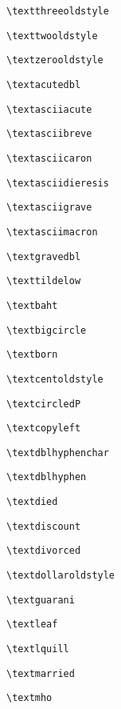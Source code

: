 \documentclass{scrartcl}
\begin{document}
\wrapglyph{\textthreeoldstyle} \verb+\textthreeoldstyle+\par
\wrapglyph{\texttwooldstyle} \verb+\texttwooldstyle+\par
\wrapglyph{\textzerooldstyle} \verb+\textzerooldstyle+\par
\wrapglyph{\textacutedbl} \verb+\textacutedbl+\par
\wrapglyph{\textasciiacute} \verb+\textasciiacute+\par
\wrapglyph{\textasciibreve} \verb+\textasciibreve+\par
\wrapglyph{\textasciicaron} \verb+\textasciicaron+\par
\wrapglyph{\textasciidieresis} \verb+\textasciidieresis+\par
\wrapglyph{\textasciigrave} \verb+\textasciigrave+\par
\wrapglyph{\textasciimacron} \verb+\textasciimacron+\par
\wrapglyph{\textgravedbl} \verb+\textgravedbl+\par
\wrapglyph{\texttildelow} \verb+\texttildelow+\par
\wrapglyph{\textbaht} \verb+\textbaht+\par
\wrapglyph{\textbigcircle} \verb+\textbigcircle+\par
\wrapglyph{\textborn} \verb+\textborn+\par
\wrapglyph{\textcentoldstyle} \verb+\textcentoldstyle+\par
\wrapglyph{\textcircledP} \verb+\textcircledP+\par
\wrapglyph{\textcopyleft} \verb+\textcopyleft+\par
\wrapglyph{\textdblhyphenchar} \verb+\textdblhyphenchar+\par
\wrapglyph{\textdblhyphen} \verb+\textdblhyphen+\par
\wrapglyph{\textdied} \verb+\textdied+\par
\wrapglyph{\textdiscount} \verb+\textdiscount+\par
\wrapglyph{\textdivorced} \verb+\textdivorced+\par
\wrapglyph{\textdollaroldstyle} \verb+\textdollaroldstyle+\par
\wrapglyph{\textguarani} \verb+\textguarani+\par
\wrapglyph{\textleaf} \verb+\textleaf+\par
\wrapglyph{\textlquill} \verb+\textlquill+\par
\wrapglyph{\textmarried} \verb+\textmarried+\par
\wrapglyph{\textmho} \verb+\textmho+\par
\end{document}

